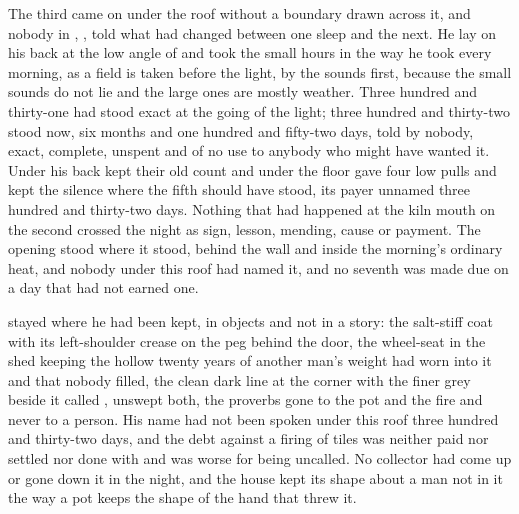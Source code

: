 
The third came on under the roof without a boundary drawn across it, and nobody in , ,  told  what had changed between one sleep and the next. He lay on his back at the low angle of  and took the small hours in the way he took every morning, as a field is taken before the light, by the sounds first, because the small sounds do not lie and the large ones are mostly weather. Three hundred and thirty-one had stood exact at the going of the light; three hundred and thirty-two stood now, six months and one hundred and fifty-two days, told by nobody, exact, complete, unspent and of no use to anybody who might have wanted it. Under his back  kept their old count and under the floor  gave four low pulls and kept the silence where the fifth should have stood, its payer unnamed three hundred and thirty-two days. Nothing that had happened at the kiln mouth on the second crossed the night as sign, lesson, mending, cause or payment. The opening stood where it stood, behind the wall and inside the morning's ordinary heat, and nobody under this roof had named it, and no seventh was made due on a day that had not earned one.

 stayed where he had been kept, in objects and not in a story: the salt-stiff coat with its left-shoulder crease on the peg behind the door, the wheel-seat in the shed keeping the hollow twenty years of another man's weight had worn into it and that nobody filled, the clean dark line at the corner with the finer grey beside it called , unswept both, the proverbs gone to the pot and the fire and never to a person. His name had not been spoken under this roof three hundred and thirty-two days, and the debt against a firing of tiles was neither paid nor settled nor done with and was worse for being uncalled. No collector had come up  or gone down it in the night, and the house kept its shape about a man not in it the way a pot keeps the shape of the hand that threw it.

